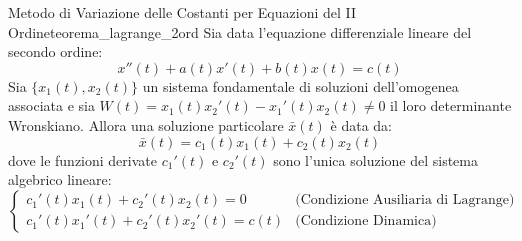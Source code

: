 \begin{teorema}{Metodo di Variazione delle Costanti per Equazioni del II Ordine}{teorema_lagrange_2ord}
Sia data l'equazione differenziale lineare del secondo ordine:
\begin{equation}
    x''(t) + a(t) x'(t) + b(t) x(t) = c(t)
\end{equation}
Sia $\{x_1(t), x_2(t)\}$ un sistema fondamentale di soluzioni dell'omogenea associata e sia $W(t) = x_1(t)x_2'(t) - x_1'(t)x_2(t) \neq 0$ il loro determinante Wronskiano.
Allora una soluzione particolare $\bar{x}(t)$ è data da:
\begin{equation}
    \label{eq:lagrange_particolare_ansatz}
    \bar{x}(t) = c_1(t) x_1(t) + c_2(t) x_2(t)
\end{equation}
dove le funzioni derivate $c_1'(t)$ e $c_2'(t)$ sono l'unica soluzione del sistema algebrico lineare:
\begin{equation}
    \label{eq:sistema_lagrange}
    \begin{cases}
        c_1'(t) x_1(t) + c_2'(t) x_2(t) = 0 & \text{(Condizione Ausiliaria di Lagrange)} \\
        c_1'(t) x_1'(t) + c_2'(t) x_2'(t) = c(t) & \text{(Condizione Dinamica)}
    \end{cases}
\end{equation}
\end{teorema}


